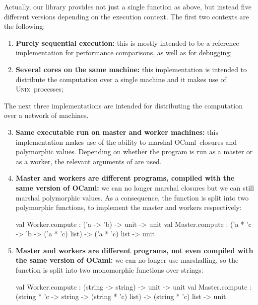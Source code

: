 \documentclass[tfpsymp,pagenumbers]{tfp07symp}
\newcommand{\Ocaml}{OCaml}
\newcommand{\unix}{\textsc{Unix}}
\begin{document}
Actually, our library provides not just a single 
function as above, but instead five different versions
depending on the execution context. 
The first two contexts are the following: 
\begin{enumerate}
\item \textbf{Purely sequential execution:}
  this is mostly intended to be a reference implementation
  for performance comparisons, as well as for debugging;

\item \textbf{Several cores on the same machine:} 
  this implementation is intended to distribute the computation over a
  single machine and it makes use of \unix\ processes;
\end{enumerate}
The next three implementations are intended for distributing the
computation over a network of machines.
\begin{enumerate}
\setcounter{enumi}{2}
\item \textbf{Same executable run on master and worker machines:}
  this implementation makes use of the ability to marshal \Ocaml\
  closures and polymorphic values.
  Depending on whether the program is run as a master or as a worker,
  the relevant arguments of \ocaml{compute} are used.

\item \textbf{Master and workers are different programs, compiled with
    the same version of \Ocaml:} 
  we can no longer marshal closures but we can still
  marshal polymorphic values. As a consequence, 
  the  function is split into two
  polymorphic functions, to implement the master and workers 
  respectively:%
\vspace{-1em}
\begin{ocaml}
val Worker.compute : ('a -> 'b) -> unit -> unit
val Master.compute : 
  ('a * 'c -> 'b -> ('a * 'c) list) -> 
  ('a * 'c) list -> unit
\end{ocaml}

\item \textbf{Master and workers are different programs, not even
    compiled with the same version of \Ocaml:} we can no
  longer use marshalling, so the
   function is split into two monomorphic functions
  over strings:%
\vspace{-1em}
\begin{ocaml}
val Worker.compute : (string -> string) -> unit -> unit
val Master.compute : 
  (string * 'c -> string -> (string * 'c) list) -> 
  (string * 'c) list -> unit
\end{ocaml}
\end{enumerate}
\end{document}

